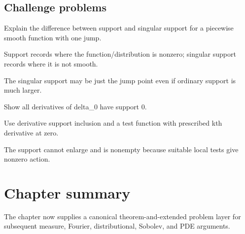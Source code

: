 \subsection*{Challenge problems}

\begin{exercise}\label{exr:iii17-expand-15}
Explain the difference between support and singular support for a piecewise smooth function with one jump.
\end{exercise}
\begin{hint}
Support records where the function/distribution is nonzero; singular support records where it is not smooth.
\end{hint}
\begin{solution}
The singular support may be just the jump point even if ordinary support is much larger.
\end{solution}

\begin{exercise}\label{exr:iii17-expand-16}
Show all derivatives of delta\_0 have support {0}.
\end{exercise}
\begin{hint}
Use derivative support inclusion and a test function with prescribed kth derivative at zero.
\end{hint}
\begin{solution}
The support cannot enlarge and is nonempty because suitable local tests give nonzero action.
\end{solution}
\section*{Chapter summary}
The chapter now supplies a canonical theorem-and-extended problem layer for subsequent measure, Fourier, distributional, Sobolev, and PDE arguments.
